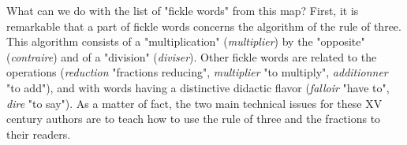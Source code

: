 \documentclass[preprint]{elsarticle}
\begin{document}
What can we do with the list of "fickle words" from this map? First, it is remarkable that a part of fickle words concerns the algorithm of the rule of three. This algorithm  consists of a "multiplication" (\textit{multiplier}) by the "opposite" (\textit{contraire}) and of a "division" (\textit{diviser}). Other fickle words are related to the operations (\textit{reduction} "fractions reducing", \textit{multiplier} "to multiply", \textit{additionner} "to add"), and with words having a distinctive didactic flavor (\textit{falloir} "have to", \textit{dire} "to say"). 
As a matter of fact, the two main technical issues for these XV century authors are to teach how to use the rule of three and the fractions to their readers.

\setlength{\tabcolsep}{1mm}
\setlength{\arrayrulewidth}{1pt}
\end{document}
